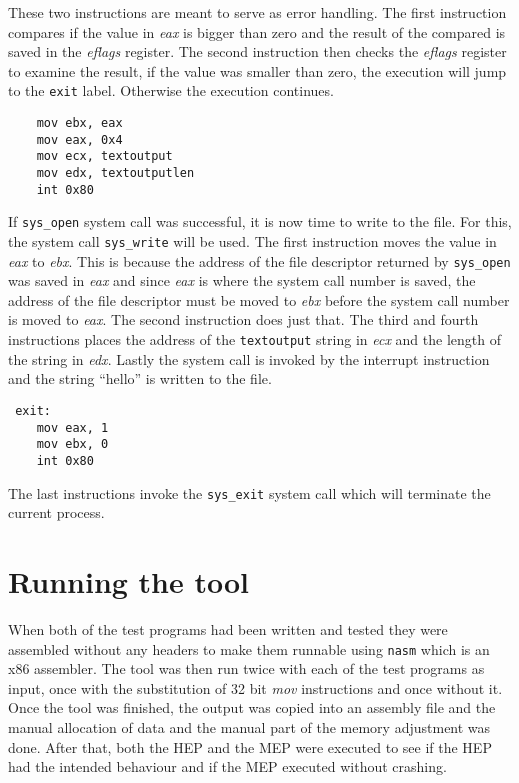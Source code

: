\documentclass[11pt,twoside]{eitExjobb}
\begin{document}
These two instructions are meant to serve as error handling. The first instruction compares if the value in \emph{eax} is bigger than zero and the result of the compared is saved in the \emph{eflags} register. The second instruction then checks the \emph{eflags} register to examine the result, if the value was smaller than zero, the execution will jump to the \texttt{exit} label. Otherwise the execution continues.

\begin{verbatim}
    mov ebx, eax
    mov eax, 0x4
    mov ecx, textoutput
    mov edx, textoutputlen
    int 0x80
\end{verbatim}

\noindent If \texttt{sys\_open} system call was successful, it is now time to write to the file. For this, the system call \texttt{sys\_write} will be used. The first instruction moves the value in \emph{eax} to \emph{ebx}. This is because the address of the file descriptor returned by \texttt{sys\_open} was saved in \emph{eax} and since \emph{eax} is where the system call number is saved, the address of the file descriptor must be moved to \emph{ebx} before the system call number is moved to \emph{eax}. The second instruction does just that. The third and fourth instructions places the address of the \texttt{textoutput} string in \emph{ecx} and the length of the string in \emph{edx}. Lastly the system call is invoked by the interrupt instruction and the string ``hello'' is written to the file.

\begin{verbatim}
 exit:
    mov eax, 1
    mov ebx, 0	
    int 0x80
\end{verbatim}

\noindent The last instructions invoke the \texttt{sys\_exit} system call which will terminate the current process. 

\section{Running the tool}
When both of the test programs had been written and tested they were assembled without any headers to make them runnable using \texttt{nasm}\cite{nasm} which is an x86 assembler. The tool was then run twice with each of the test programs as input, once with the substitution of 32 bit \emph{mov} instructions and once without it. Once the tool was finished, the output was copied into an assembly file and the manual allocation of data and the manual part of the memory adjustment was done. After that, both the HEP and the MEP were executed to see if the HEP had the intended behaviour and if the MEP executed without crashing.
\end{document}
